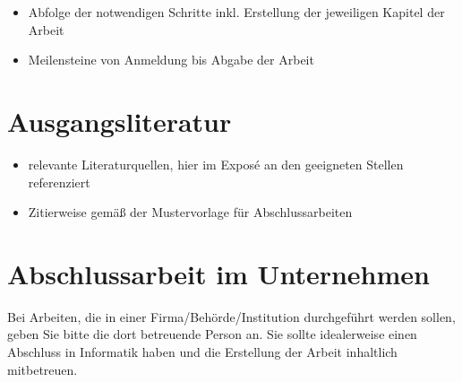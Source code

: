 \documentclass[12pt]{article} %
\begin{document}
\begin{itemize}
\item Abfolge der notwendigen Schritte inkl. Erstellung der jeweiligen Kapitel der Arbeit
\item Meilensteine von Anmeldung bis Abgabe der Arbeit
\end{itemize}


\section{Ausgangsliteratur}

\begin{itemize}
\item relevante Literaturquellen, hier im Exposé an den geeigneten Stellen referenziert
\item Zitierweise gemäß der Mustervorlage für Abschlussarbeiten
\end{itemize}


\section{Abschlussarbeit im Unternehmen}

Bei Arbeiten, die in einer Firma/Behörde/Institution durchgeführt werden sollen,
geben Sie bitte die dort betreuende Person an. Sie sollte idealerweise einen
Abschluss in Informatik haben und die Erstellung der Arbeit inhaltlich mitbetreuen.
\end{document}
